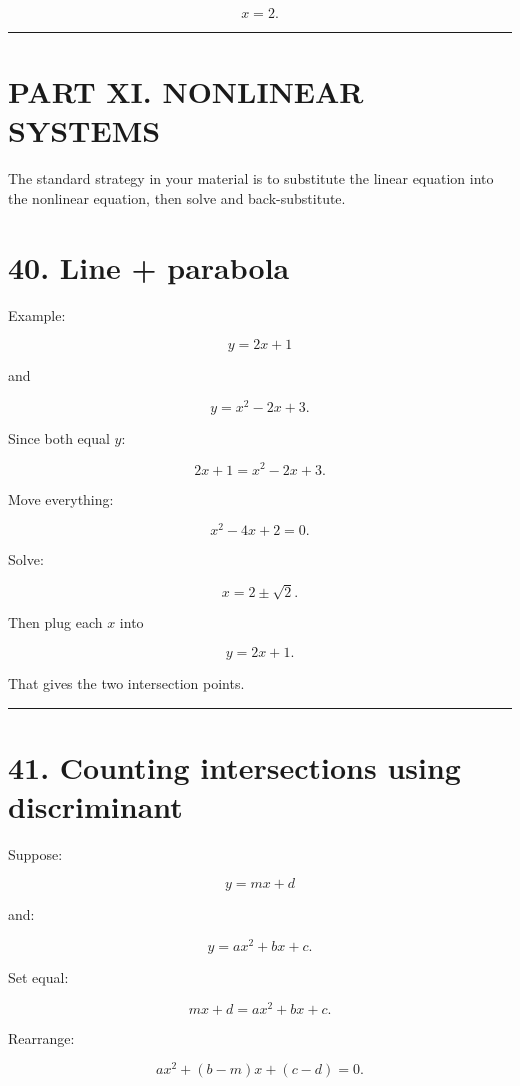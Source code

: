 \documentclass[
]{article}
\begin{document}
\[
\boxed{x=2}.
\]

\begin{center}\rule{0.5\linewidth}{0.5pt}\end{center}

\section{PART XI. NONLINEAR SYSTEMS}\label{part-xi.-nonlinear-systems}

The standard strategy in your material is to substitute the linear
equation into the nonlinear equation, then solve and back-substitute.

\section{40. Line + parabola}\label{line-parabola}

Example:

\[
y=2x+1
\]

and

\[
y=x^2-2x+3.
\]

Since both equal \(y\):

\[
2x+1=x^2-2x+3.
\]

Move everything:

\[
x^2-4x+2=0.
\]

Solve:

\[
x=2\pm\sqrt2.
\]

Then plug each \(x\) into

\[
y=2x+1.
\]

That gives the two intersection points.

\begin{center}\rule{0.5\linewidth}{0.5pt}\end{center}

\section{41. Counting intersections using
discriminant}\label{counting-intersections-using-discriminant}

Suppose:

\[
y=mx+d
\]

and:

\[
y=ax^2+bx+c.
\]

Set equal:

\[
mx+d=ax^2+bx+c.
\]

Rearrange:

\[
ax^2+(b-m)x+(c-d)=0.
\]
\end{document}
